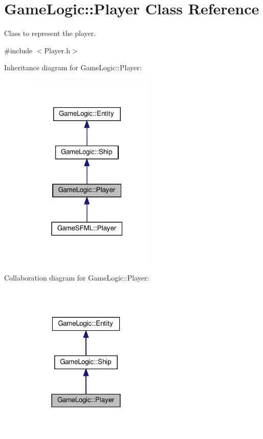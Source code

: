 \hypertarget{classGameLogic_1_1Player}{}\section{Game\+Logic\+:\+:Player Class Reference}
\label{classGameLogic_1_1Player}


Class to represent the player.  




{\ttfamily \#include $<$Player.\+h$>$}



Inheritance diagram for Game\+Logic\+:\+:Player\+:\nopagebreak
\begin{figure}[H]
\begin{center}
\leavevmode
\includegraphics[width=183pt]{classGameLogic_1_1Player__inherit__graph}
\end{center}
\end{figure}


Collaboration diagram for Game\+Logic\+:\+:Player\+:\nopagebreak
\begin{figure}[H]
\begin{center}
\leavevmode
\includegraphics[width=180pt]{classGameLogic_1_1Player__coll__graph}
\end{center}
\end{figure}
